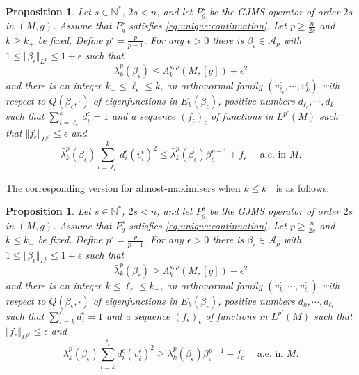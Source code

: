 \documentclass[10pt]{amsart}
\numberwithin{equation}{section}
\theoremstyle{plain}
\newtheorem{prop}[theo]{Proposition}%
\theoremstyle{remark}
\begin{document}
\begin{prop} \label{prop:PS} Let $s \in \mathbb{N}^*$, $2s <n$, and let $P_g^s$ be the GJMS operator of order $2s$ in $(M,g)$. Assume that $P_g^s$ satisfies \eqref{eq:unique:continuation}.  Let $p \geq \frac{n}{2s}$ and $k\geq k_+$ be fixed. Define $p' = \frac{p}{p-1}$. For any $\epsilon >0$ there is $\beta_\epsilon \in \mathcal{A}_p$ with $1 \leq \Vert \beta_\epsilon \Vert_{L^p} \leq 1 + \epsilon$ such that
\begin{equation*} %
 \bar{\lambda}_k^p(\beta_{\epsilon}) \leq  \Lambda_k^{s,p}(M,[g]) + \epsilon^2 
 \end{equation*}
and there is an integer $k_+ \le \ell_\epsilon \leq k$, an orthonormal family $(v_{\ell_\epsilon}^\epsilon,\cdots,v_k^\epsilon) $ with respect to $Q(\beta_\epsilon,\cdot)$ of eigenfunctions in $E_k(\beta_\epsilon)$, positive numbers  $d_{\ell_\epsilon},\cdots, d_k$ such that $\sum_{i=\ell_\epsilon}^k d_i^\epsilon = 1$ and a sequence $(f_\epsilon)_{\epsilon}$ of functions in $ L^{p'}(M)$ such that  $ \Vert f_\epsilon \Vert_{L^{p'}} \leq \epsilon $ and 
\begin{equation*} %
\bar{\lambda}^p_k(\beta_\epsilon) \sum_{i=\ell_\epsilon}^k d_i^\epsilon \left(v_i^\epsilon\right)^2 \leq \bar{\lambda}^p_k(\beta_\epsilon)\beta_\epsilon^{p-1} + f_\epsilon  \quad \text{ a.e. in } M.
\end{equation*}
\end{prop}
The corresponding version for almost-maximisers when $k \le k_{-}$ is as follows: 

\begin{prop} \label{prop:PS2}
Let $s \in \mathbb{N}^*$, $2s <n$, and let $P_g^s$ be the GJMS operator of order $2s$ in $(M,g)$. Assume that $P_g^s$ satisfies \eqref{eq:unique:continuation}. Let $p \geq \frac{n}{2s}$ and $k\leq k_-$ be fixed. Define $p' = \frac{p}{p-1}$. For any $\epsilon >0$ there is $\beta_\epsilon \in \mathcal{A}_p$ with $1 \leq \Vert \beta_\epsilon \Vert_{L^p} \leq 1 + \epsilon$ such that
\begin{equation*} %
 \bar{\lambda}_k^p(\beta_{\epsilon}) \geq  \Lambda_k^{s,p}(M,[g]) - \epsilon^2 
 \end{equation*}
and there is an integer $k \le \ell_\epsilon \leq k_-$, an orthonormal family $(v_{k}^\epsilon,\cdots,v_{\ell_\epsilon}^\epsilon) $ with respect to $Q(\beta_\epsilon,\cdot)$ of eigenfunctions in $E_k(\beta_\epsilon)$, positive numbers  $d_k, \cdots, d_{\ell_\epsilon}$ such that $\sum_{i=k}^{\ell_\epsilon} d_i^\epsilon = 1$ and a sequence $(f_\epsilon)_{\epsilon}$ of functions in $ L^{p'}(M)$ such that  $ \Vert f_\epsilon \Vert_{L^{p'}} \leq \epsilon $ and 
\begin{equation*} %
 \bar{\lambda}^p_k(\beta_\epsilon) \sum_{i=k}^{\ell_\epsilon} d_i^\epsilon \left(v_i^\epsilon\right)^2 \geq \bar{\lambda}^p_k(\beta_\epsilon)\beta_\epsilon^{p-1} - f_\epsilon   \quad \text{ a.e. in } M.
\end{equation*}
\end{prop}
\end{document}
